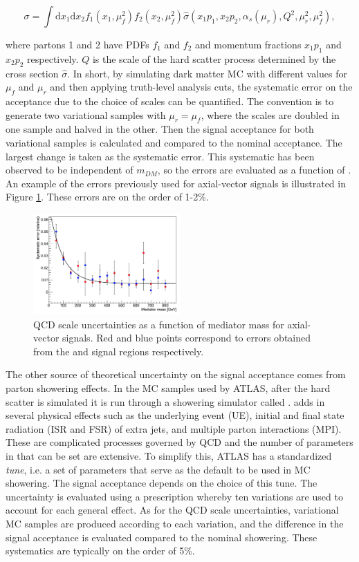 \begin{equation}
\sigma = \int \text{d}x_1 \text{d}x_2 f_1(x_1, \mu_f^2) f_2 (x_2, \mu_f^2) \hat{\sigma}(x_1 p_1, x_2 p_2, \alpha_s(\mu_r), Q^2, \mu_r^2, \mu_f^2),
\end{equation}

\noindent where partons 1 and 2 have PDFs $f_1$ and $f_2$ and momentum fractions $x_1 p_1$ and $x_2 p_2$ respectively. $Q$ is the scale of the hard scatter process determined by the cross section $\hat{\sigma}$.
In short, by simulating dark matter MC with different values for $\mu_f$ and $\mu_r$ and then applying truth-level analysis cuts, the systematic error on the acceptance due to the choice of scales can be quantified. The convention is to generate two variational samples with $\mu_r = \mu_f$, where the scales are doubled in one sample and halved in the other. Then the signal acceptance for both variational samples is calculated and compared to the nominal acceptance. The largest change is taken as the systematic error. This systematic has been observed to be independent of $m_{DM}$, so the errors are evaluated as a function of \mmed. An example of the errors previously used for axial-vector signals is illustrated in Figure \ref{fig:qcd}. These errors are on the order of 1-2\%.

\begin{figure}[htb]
\centering
\includegraphics[width=0.5\textwidth]{Figures/qcd.png}
\caption{QCD scale uncertainties as a function of mediator mass for axial-vector signals. Red and blue points correspond to errors obtained from the \ee and \mm signal regions respectively.}
\label{fig:qcd}
\end{figure}

The other source of theoretical uncertainty on the signal acceptance comes from parton showering effects. In the MC samples used by ATLAS, after the hard scatter is simulated it is run through a showering simulator called \pythia. \pythia adds in several physical effects such as the underlying event (UE), initial and final state radiation (ISR and FSR) of extra jets, and multiple parton interactions (MPI). These are complicated processes governed by QCD and the number of parameters in \pythia that can be set are extensive. To simplify this, ATLAS has a standardized \pythia \textit{tune}, i.e. a set of parameters that serve as the default to be used in MC showering. The signal acceptance depends on the choice of this tune. The uncertainty is evaluated using a prescription whereby ten variations are used to account for each general effect. As for the QCD scale uncertainties, variational MC samples are produced according to each variation, and the difference in the signal acceptance is evaluated compared to the nominal showering. These systematics are typically on the order of 5\%.


